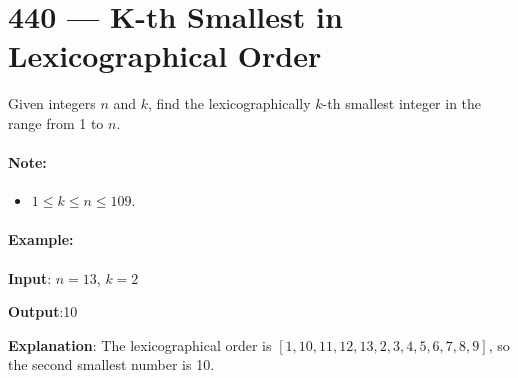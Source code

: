 \section{440 --- K-th Smallest in Lexicographical Order}
Given integers $n$ and $k$, find the lexicographically $k$-th smallest integer in the range from 1 to $n$.

\paragraph{Note:} 
\begin{itemize}
\item $1 \leq k \leq n \leq 109$.
\end{itemize}

\paragraph{Example:}

\begin{flushleft}
\textbf{Input}: $n=13$, $k=2$

\textbf{Output}:10

\textbf{Explanation}: The lexicographical order is $[1, 10, 11, 12, 13, 2, 3, 4, 5, 6, 7, 8, 9]$, so the second smallest number is 10.
\end{flushleft}

